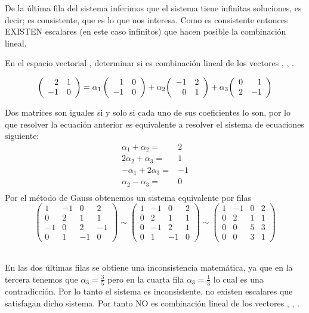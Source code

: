 De la última fila del sistema inferimos que el sistema tiene infinitas soluciones, es decir; es consistente, que es lo que nos interesa. Como es consistente entonces EXISTEN escalares (en este caso infinitos) que hacen posible la combinación lineal.

\begin{ejemplo}
En el espacio vectorial \mdosxdos, determinar si 
 es combinación lineal de los vectores 
, , .
\end{ejemplo}


\[ \left( \begin{array}{rr} 2&1\\ -1&0 \end{array} \right) =
\alpha_1 \left( \begin{array}{rr} 1&0\\ -1&0 \end{array} \right) 
+{\alpha_2}{ \left( \begin{array}{rr} -1&2\\ 0&1 \end{array} \right) }
+{\alpha_3}{ \left( \begin{array}{rr} 0&1\\ 2&-1 \end{array} \right) }
\]

Dos matrices son iguales si y solo si cada uno de sus coeficientes
lo son, por lo que resolver la ecuación anterior es equivalente a resolver el sistema de ecuaciones siguiente:
\begin{align*}
\alpha_1+\alpha_2=&2\\
2\alpha_2+\alpha_3=&1\\
-\alpha_1+2\alpha_3=&-1\\
\alpha_2-\alpha_3=&0\\
\end{align*}
Por el método de Gauss obtenemos un sistema equivalente por filas
\[
\left(
\begin{array}{rrr|r}
1 &-1 &0 &2\\
0&2&1&1\\
-1&0&2&-1\\
0&1&-1&0
\end{array}
\right)
\sim
\left(
\begin{array}{rrr|r}
1 &-1 &0 &2\\
0&2&1&1\\
0&-1&2&1\\
0&1&-1&0
\end{array}
\right)
\sim
\left(
\begin{array}{rrr|r}
1 &-1 &0 &2\\
0&2&1&1\\
0&0&5&3\\
0&0&3&1
\end{array}
\right)\]

~\\
En las dos últimas filas se obtiene una inconsistencia matem\'atica, ya que en la tercera tenemos que 
$\alpha_3=\frac{3}{5}$ 
pero en la cuarta fila 
$\alpha_3=\frac{1}{3}$
lo cual es una contradicción. Por lo tanto el sistema es inconsistente, no existen escalares que satisfagan dicho sistema. Por tanto  NO
 es combinación lineal de los vectores , , .

